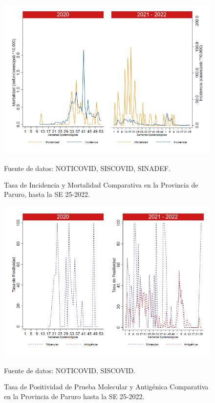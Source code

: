 \documentclass[12pt,a4paper,openany]{book}
\begin{document}
	\begin{figure}[h]
		\caption{Tasa de Incidencia y Mortalidad Comparativa en la Provincia de Paruro, hasta la SE 25-2022.}\label{fig:inc_mort_paruro}
		\begin{center}
			\includegraphics[width=0.85\linewidth]{../figuras/incidencia_mortalidad_20_21_10.png}
		\end{center}
		{\footnotesize {Fuente de datos: NOTICOVID, SISCOVID, SINADEF.}} 
	\end{figure}
	
	\begin{figure}[h]
		\caption{Tasa de Positividad de Prueba Molecular y Antigénica Comparativa en la Provincia de Paruro hasta la SE 25-2022.}\label{fig:positividad_paruro}
		\begin{center}
			\includegraphics[width=0.7\linewidth]{../figuras/positividad_20_21_10.png}
		\end{center}
		{\footnotesize {Fuente de datos: NOTICOVID, SISCOVID.}}
	\end{figure}
	
\end{document}
